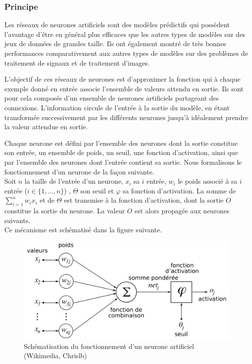 \subsubsection{Principe}
\par Les réseaux de neurones artificiels sont des modèles prédictifs qui possèdent l'avantage d'être en général plus efficaces que les autres types de modèles sur des jeux de données de grandes taille. Ils ont également montré de très bonnes performances comparativement aux autres types de modèles sur des problèmes de traitement de signaux et de traitement d'images.\\

\par L'objectif de ces réseaux de neurones est d'approximer la fonction qui à chaque exemple donné en entrée associe l'ensemble de valeurs attendu en sortie. Ils sont pour cela composés d'un ensemble de neurones artificiels partageant des connexions. L'information circule de l'entrée à la sortie du modèle, en étant transformée successivement par les différents neurones jusqu'à idéalement prendre la valeur attendue en sortie.\\

\par Chaque neurone est défini par l'ensemble des neurones dont la sortie constitue son entrée, un ensemble de poids, un seuil, une fonction d'activation, ainsi que par l'ensemble des neurones dont l'entrée contient sa sortie. Nous formalisons le fonctionnement d'un neurone de la façon suivante.\\
Soit $n$ la taille de l'entrée d'un neurone, $x_i$ sa $i$ entrée, $w_i$ le poids associé à sa $i$ entrée ($i \in \{1, ..., n\}$) , $\Theta$ son seuil et $\varphi$ sa fonction d'activation. La somme de $\sum\limits_{i=1}^n w_ix_i$ et de $\Theta$ est transmise à la fonction d'activation, dont la sortie $O$ constitue la sortie du neurone. La valeur $O$ est alors propagée aux neurones suivants.\\
Ce mécanisme est schématisé dans la figure suivante.

\begin{figure}[!h]
	\centering
	\includegraphics[scale=0.3]{images/neurone.png}
	\caption{Schématisation du fonctionnement d'un neurone artificiel (Wikimedia, Chrislb)}
\end{figure}

